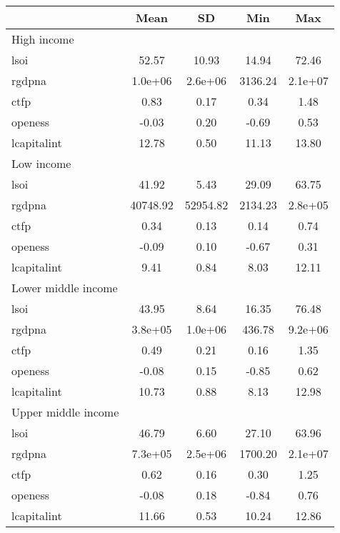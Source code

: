 {
\def\sym#1{\ifmmode^{#1}\else\(^{#1}\)\fi}
\begin{tabular}{l*{1}{cccc}}
\hline\hline
            &        Mean&          SD&         Min&         Max\\
\hline
High income &            &            &            &            \\
lsoi        &       52.57&       10.93&       14.94&       72.46\\
rgdpna      &     1.0e+06&     2.6e+06&     3136.24&     2.1e+07\\
ctfp        &        0.83&        0.17&        0.34&        1.48\\
openess     &       -0.03&        0.20&       -0.69&        0.53\\
lcapitalint &       12.78&        0.50&       11.13&       13.80\\
\hline
Low income  &            &            &            &            \\
lsoi        &       41.92&        5.43&       29.09&       63.75\\
rgdpna      &    40748.92&    52954.82&     2134.23&     2.8e+05\\
ctfp        &        0.34&        0.13&        0.14&        0.74\\
openess     &       -0.09&        0.10&       -0.67&        0.31\\
lcapitalint &        9.41&        0.84&        8.03&       12.11\\
\hline
Lower middle income&            &            &            &            \\
lsoi        &       43.95&        8.64&       16.35&       76.48\\
rgdpna      &     3.8e+05&     1.0e+06&      436.78&     9.2e+06\\
ctfp        &        0.49&        0.21&        0.16&        1.35\\
openess     &       -0.08&        0.15&       -0.85&        0.62\\
lcapitalint &       10.73&        0.88&        8.13&       12.98\\
\hline
Upper middle income&            &            &            &            \\
lsoi        &       46.79&        6.60&       27.10&       63.96\\
rgdpna      &     7.3e+05&     2.5e+06&     1700.20&     2.1e+07\\
ctfp        &        0.62&        0.16&        0.30&        1.25\\
openess     &       -0.08&        0.18&       -0.84&        0.76\\
lcapitalint &       11.66&        0.53&       10.24&       12.86\\
\hline\hline
\end{tabular}
}
